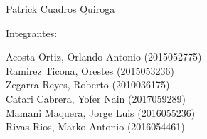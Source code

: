 \documentclass[12pt,letterpaper]{article}
\begin{document}
\begin{titlepage}
\begin{center}
\vspace*{0.1in}
\begin{large}
 Patrick Cuadros Quiroga\\
\end{large}
\vspace*{0.2in}
\vspace*{0.1in}
\begin{large}
Integrantes: \\
\begin{flushleft}
Acosta Ortiz, Orlando Antonio                  \hfill	(2015052775) \\
Ramirez Ticona, Orestes                           \hfill  (2015053236) \\
Zegarra Reyes, Roberto  		            \hfill 	(2010036175) \\
Catari Cabrera, Yofer Nain 		\hfill 	(2017059289) \\
Mamani Maquera, Jorge Luis                   \hfill 	(2016055236) \\
Rivas Rios, Marko Antonio                       \hfill 	(2016054461) \\
\end{flushleft}
\end{large}
\end{center}

\end{titlepage}


\tableofcontents %
\thispagestyle{empty} %
\newpage
\setcounter{page}{1} %








\end{document}
